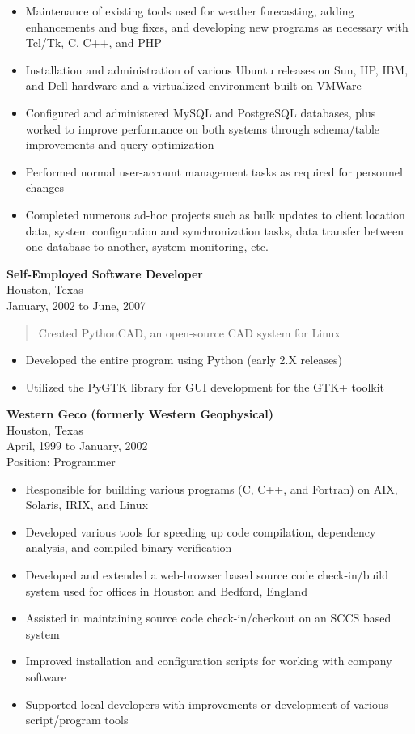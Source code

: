 \documentclass[10pt]{article}
\begin{document}
\begin{itemize}
\item Maintenance of existing tools used for weather forecasting, adding enhancements and bug fixes, and developing new programs as necessary with Tcl/Tk, C, C++, and PHP
\item Installation and administration of various Ubuntu releases on Sun, HP, IBM, and Dell hardware and a virtualized environment built on VMWare
\item Configured and administered MySQL and PostgreSQL databases, plus worked to improve performance on both systems through schema/table improvements and query optimization
\item Performed normal user-account management tasks as required for personnel changes
\item Completed numerous ad-hoc projects such as bulk updates to client location data, system configuration and synchronization tasks, data transfer between one database to another, system monitoring, etc.
\end{itemize}

\textbf{Self-Employed Software Developer}\\
Houston, Texas\\
January, 2002 to June, 2007

\begin{quote}
\setlength{\baselineskip}{5pt}
Created PythonCAD, an open-source CAD system for Linux
\end{quote}
\begin{itemize}
\item Developed the entire program using Python (early 2.X releases)
\item Utilized the PyGTK library for GUI development for the GTK+ toolkit
\end{itemize}
\pagebreak

\textbf{Western Geco (formerly Western Geophysical)}\\
Houston, Texas\\
April, 1999 to January, 2002\\
Position: Programmer

\begin{itemize}
\item Responsible for building various programs (C, C++, and Fortran) on
AIX, Solaris, IRIX, and Linux
\item Developed various tools for speeding up code compilation, dependency analysis, and compiled binary verification
\item Developed and extended a web-browser based source code check-in/build
system used for offices in Houston and Bedford, England
\item Assisted in maintaining source code check-in/checkout on an SCCS based system
\item Improved installation and configuration scripts for working with company software
\item Supported local developers with improvements or development of various
script/program tools
\end{itemize}
\end{document}

